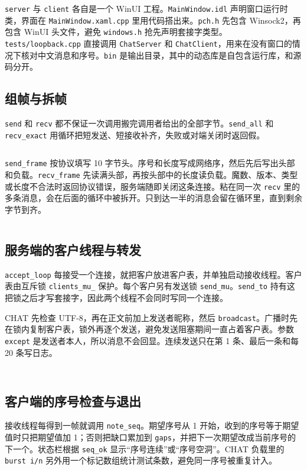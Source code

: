 \documentclass[10.5pt,a4paper,UTF8]{article}
\begin{document}
\texttt{server} 与 \texttt{client} 各自是一个 WinUI 工程。\texttt{MainWindow.idl} 声明窗口运行时类，界面在 \texttt{MainWindow.xaml.cpp} 里用代码搭出来。\texttt{pch.h} 先包含 Winsock2，再包含 WinUI 头文件，避免 \texttt{windows.h} 抢先声明套接字类型。\texttt{tests/loopback.cpp} 直接调用 \texttt{ChatServer} 和 \texttt{ChatClient}，用来在没有窗口的情况下核对中文消息和序号。\texttt{bin} 是输出目录，其中的动态库是自包含运行库，和源码分开。

\subsection{组帧与拆帧}
\texttt{send} 和 \texttt{recv} 都不保证一次调用搬完调用者给出的全部字节。\texttt{send\_all} 和 \texttt{recv\_exact} 用循环把短发送、短接收补齐，失败或对端关闭时返回假。

\inputminted[firstline=106,lastline=128,linenos,firstnumber=106]{cpp}{shared/netutil.cpp}

\texttt{send\_frame} 按协议填写 10 字节头。序号和长度写成网络序，然后先后写出头部和负载。\texttt{recv\_frame} 先读满头部，再按头部中的长度读负载。魔数、版本、类型或长度不合法时返回协议错误，服务端随即关闭这条连接。粘在同一次 \texttt{recv} 里的多条消息，会在后面的循环中被拆开。只到达一半的消息会留在循环里，直到剩余字节到齐。

\inputminted[firstline=150,lastline=184,linenos,firstnumber=150]{cpp}{shared/netutil.cpp}

\subsection{服务端的客户线程与转发}
\texttt{accept\_loop} 每接受一个连接，就把客户放进客户表，并单独启动接收线程。客户表由互斥锁 \texttt{clients\_mu\_} 保护。每个客户另有发送锁 \texttt{send\_mu}。\texttt{send\_to} 持有这把锁之后才写套接字，因此两个线程不会同时写同一个连接。

CHAT 先检查 UTF-8，再在正文前加上发送者昵称，然后 \texttt{broadcast}。广播时先在锁内复制客户表，锁外再逐个发送，避免发送阻塞期间一直占着客户表。参数 \texttt{except} 是发送者本人，所以消息不会回显。连续发送只在第 1 条、最后一条和每 20 条写日志。

\inputminted[firstline=203,lastline=221,linenos,firstnumber=203]{cpp}{shared/server_core.cpp}

\inputminted[firstline=276,lastline=288,linenos,firstnumber=276]{cpp}{shared/server_core.cpp}

\subsection{客户端的序号检查与退出}
接收线程每得到一帧就调用 \texttt{note\_seq}。期望序号从 1 开始，收到的序号等于期望值时只把期望值加 1；否则把缺口累加到 \texttt{gaps}，并把下一次期望改成当前序号的下一个。状态栏根据 \texttt{seq\_ok} 显示“序号连续”或“序号空洞”。CHAT 负载里的 \texttt{burst i/n} 另外用一个标记数组统计测试条数，避免同一序号被重复计入。
\end{document}
